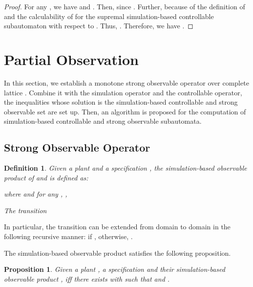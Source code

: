 \documentclass[12pt,draftcls,onecolumn]{IEEEtran}
\newtheorem{Proposition}{Proposition}
\newtheorem{Definition}{Definition}
\begin{document}
\begin{proof}
For any , we have  and . Then,  since . Further,  because of the
definition of  and the calculability of 
for the supremal simulation-based controllable subautomaton with
respect to . Thus, . Therefore, we have
.
\end{proof}




\section{Partial Observation}
In this section, we establish a monotone strong observable operator
over complete lattice . Combine it with
the simulation operator and the controllable operator, the
inequalities whose solution is the simulation-based controllable and
strong observable set are set up. Then, an algorithm is proposed for
the computation of simulation-based controllable and strong
observable subautomata.





\subsection{Strong Observable Operator}



\begin{Definition}
Given a plant  and a
specification , the
simulation-based observable product of  and  is defined as:

where  and for any
, ,

The transition 

\end{Definition}

In particular, the transition can be extended from domain  to
domain  in the
following recursive manner: 
   if , otherwise,
.

The simulation-based observable product  satisfies
the following proposition.


\begin{Proposition} \label{all}
Given a plant , a specification
 and their simulation-based
observable product ,  iff there exists  with
 such that  and .
\end{Proposition}
\end{document}
